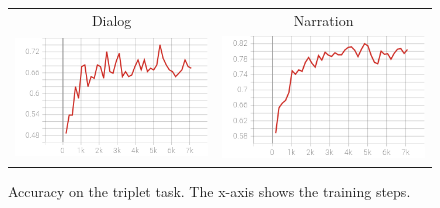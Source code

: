\begin{figure}
  \centering
  \begin{tabular}{cc}
    Dialog & Narration \\
    \includegraphics[scale=0.3]{val_acc3.png}  & \includegraphics[scale=0.3]{valnarr_acc3.png}\\
  \end{tabular}
  \caption{Accuracy on the triplet task. The x-axis shows the training
    steps.}
  \label{fig:triplet}
\end{figure}